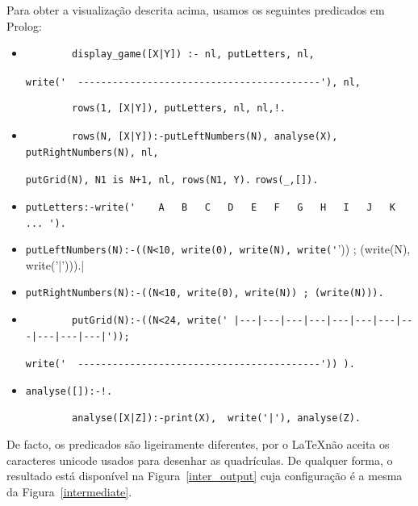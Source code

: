 \documentclass[a4paper]{article}
\begin{document}
Para obter a visualização descrita acima, usamos os seguintes predicados em Prolog:
\begin{itemize}
	\item 
	\begin{verbatim}
		display_game([X|Y]) :- nl, putLetters, nl,
	\end{verbatim}
	\verb|write('  ------------------------------------------'), nl,|
	\begin{verbatim}
		rows(1, [X|Y]), putLetters, nl, nl,!.
	\end{verbatim}
	\item
	\begin{verbatim}
		rows(N, [X|Y]):-putLeftNumbers(N), analyse(X), putRightNumbers(N), nl,
	\end{verbatim}
	\verb|putGrid(N), N1 is N+1, nl, rows(N1, Y).|\linebreak
	\verb|rows(_,[]).|
	\item
	\verb|putLetters:-write('    A   B   C   D   E   F   G   H   I   J   K   ... ').|
	\item
	\verb|putLeftNumbers(N):-((N<10, write(0), write(N), write('|')) ; (write(N), write('|'))).|
	\item
	\verb|putRightNumbers(N):-((N<10, write(0), write(N)) ; (write(N))).|
	\item
	\begin{verbatim}
		putGrid(N):-((N<24, write(' |---|---|---|---|---|---|---|---|---|---|---|'));
	\end{verbatim}
	\verb|write('  ------------------------------------------')) ).|
	\item
	\verb|analyse([]):-!.|
	\begin{verbatim}
		analyse([X|Z]):-print(X),  write('|'), analyse(Z).
	\end{verbatim}
\end{itemize}
De facto, os predicados são ligeiramente diferentes, por o \LaTeX não aceita os caracteres unicode usados para desenhar as quadrículas. De qualquer forma, o resultado está disponível na Figura~\ref{inter_output} cuja configuração é a mesma da Figura~\ref{intermediate}.

\end{document}
